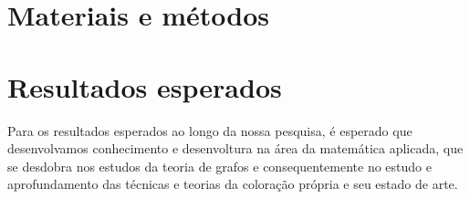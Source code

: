 \documentclass[12pt]{article}
\begin{document}
	
	\section{Materiais e métodos}
	
	
	
	\section{Resultados esperados}
	Para os resultados esperados ao longo da nossa pesquisa, é esperado que desenvolvamos conhecimento e desenvoltura na área da matemática aplicada, que se desdobra nos estudos da teoria de grafos e consequentemente no estudo e aprofundamento das técnicas e teorias da coloração própria e seu estado de arte.
	
	
	
\end{document}
